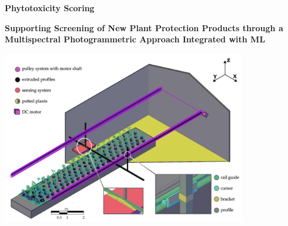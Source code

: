 \documentclass[aspectratio=43]{beamer}
\begin{document}
\begin{frame}
    \begin{center}
        \Huge \textbf{Phytotoxicity Scoring}
        \vspace{0.5cm}
        
        \Large \textbf{Supporting Screening of New Plant Protection Products through a Multispectral Photogrammetric Approach Integrated with ML}
        
        \vspace{1cm}
        \begin{center}
            \includegraphics[width=0.8\textwidth]{Imgs/agronomy-14-00306-g001.png}
        \end{center}
    \end{center}
\end{frame}

\end{document}
